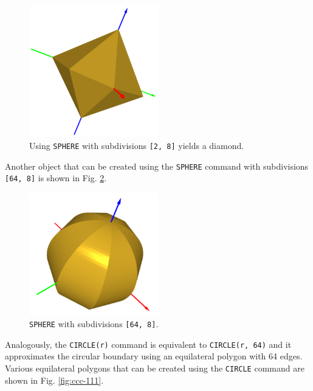 \begin{figure}[!ht]
\begin{center}
\includegraphics[width=0.5\textwidth]{img/diam-111.png}
\end{center}
\vspace{-4mm}
\caption{Using {\tt SPHERE} with subdivisions {\tt [2, 8]} yields a diamond.}
\label{fig:diam-111}
\end{figure}
\noindent
Another object that can be created using the {\tt SPHERE} command 
with subdivisions {\tt [64, 8]} is shown in Fig. \ref{fig:diam-112}.

\begin{figure}[!ht]
\begin{center}
\includegraphics[width=0.5\textwidth]{img/diam-112.png}
\end{center}
\vspace{-4mm}
\caption{{\tt SPHERE} with subdivisions {\tt [64, 8]}.}
\label{fig:diam-112}
\end{figure}
\noindent
Analogously, the {\tt CIRCLE(r)} command is equivalent to {\tt CIRCLE(r, 64)} 
and it approximates the circular boundary using an equilateral polygon with 
64 edges. Various equilateral polygons that can be created using the 
{\tt CIRCLE} command are shown in Fig. \ref{fig:ccc-111}.

